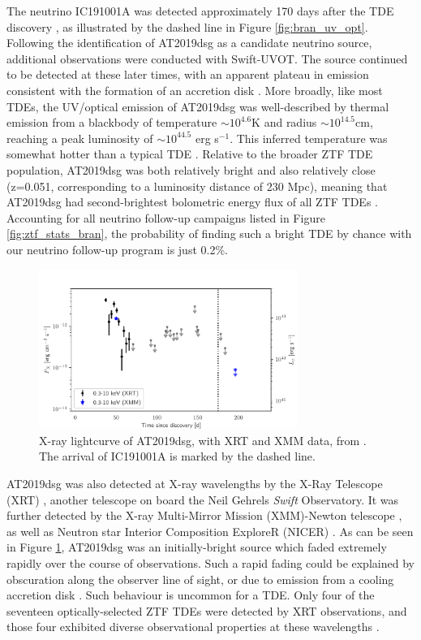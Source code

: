 \documentclass[a4paper,11pt]{article}
\begin{document}
The neutrino IC191001A was detected approximately 170 days after the TDE discovery \cite{bran}, as illustrated by the dashed line in Figure \ref{fig:bran_uv_opt}. Following the identification of AT2019dsg as a candidate neutrino source, additional observations were conducted with Swift-UVOT. The source continued to be detected at these later times, with an apparent plateau in emission consistent with the formation of an accretion disk \cite{bran}. More broadly, like most TDEs, the UV/optical emission of AT2019dsg was well-described by thermal emission from a blackbody of temperature $\sim10^{4.6}$K and radius $\sim10^{14.5}$cm, reaching a peak luminosity of $\sim10^{44.5}$ erg s$^{-1}$. This inferred temperature was somewhat hotter than a typical TDE \cite{van_velzen_20}. Relative to the broader ZTF TDE population, AT2019dsg was both relatively bright and also relatively close (z=0.051, corresponding to a luminosity distance of 230 Mpc), meaning that AT2019dsg had second-brightest bolometric energy flux of all ZTF TDEs \cite{van_velzen_20}. Accounting for all neutrino follow-up campaigns listed in Figure \ref{fig:ztf_stats_bran}, the probability of finding such a bright TDE by chance with our neutrino follow-up program is just 0.2\%.

\begin{figure}[!ht]
	\centering
	\includegraphics[width=0.75\textwidth]{figures/xray_lightcurve}
	\caption{X-ray lightcurve of AT2019dsg, with XRT and XMM data, from \cite{bran}. The arrival of IC191001A is marked by the dashed line.}
	\label{fig:bran_xray}
\end{figure}

AT2019dsg was also detected at X-ray wavelengths by the X-Ray Telescope (XRT) \cite{swift_xrt_05}, another telescope on board the Neil Gehrels \textit{Swift} Observatory. It was further detected by the X-ray Multi-Mirror Mission (XMM)-Newton telescope \cite{xmm_01}, as well as Neutron star Interior Composition ExploreR (NICER) \cite{nicer_16,cannizzaro_21}. As can be seen in Figure \ref{fig:bran_xray}, AT2019dsg was an initially-bright source which faded extremely rapidly over the course of observations. Such a rapid fading could be explained by obscuration along the observer line of sight, or due to emission from a cooling accretion disk \cite{bran}. Such behaviour is uncommon for a TDE. Only four of the seventeen optically-selected ZTF TDEs were detected by XRT observations, and those four exhibited diverse observational properties at these wavelengths \cite{van_velzen_20}.
\end{document}
